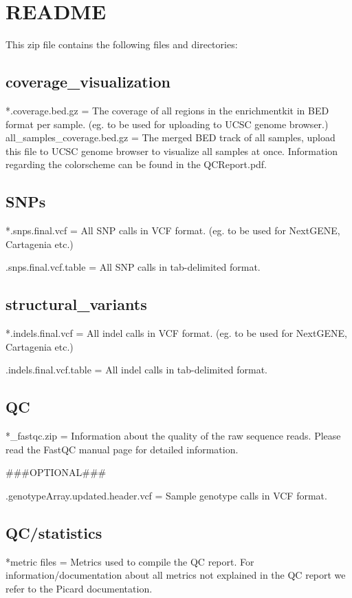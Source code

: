 \documentclass[a4paper,12pt]{article}
\begin{document}
\thispagestyle{empty}
\vspace{40mm}


\clearpage
\section*{README}

This zip file contains the following files and directories:
\subsection*{coverage_visualization}
*.coverage.bed.gz = The coverage of all regions in the enrichmentkit in BED format per sample. (eg. to be used for uploading to UCSC genome browser.)
all_samples_coverage.bed.gz =  The merged BED track of all samples, upload this file to UCSC genome browser to visualize all samples at once.
Information regarding the colorscheme can be found in the QCReport.pdf.

\subsection*{SNPs}
*.snps.final.vcf = All SNP calls in VCF format. (eg. to be used for NextGENE, Cartagenia etc.)

\noindent*.snps.final.vcf.table = All SNP calls in tab-delimited format.

\subsection*{structural_variants}
*.indels.final.vcf = All indel calls in VCF format. (eg. to be used for NextGENE, Cartagenia etc.)

\noindent*.indels.final.vcf.table = All indel calls in tab-delimited format.

\subsection*{QC}
*_fastqc.zip = Information about the quality of the raw sequence reads. Please read the FastQC manual page for detailed information.

\#\#\#OPTIONAL\#\#\#

\noindent*.genotypeArray.updated.header.vcf = Sample genotype calls in VCF format.


\subsection*{QC/statistics}
*metric files = Metrics used to compile the QC report. For information/documentation about all metrics not explained in the QC report we refer to the Picard documentation.
\end{document}
